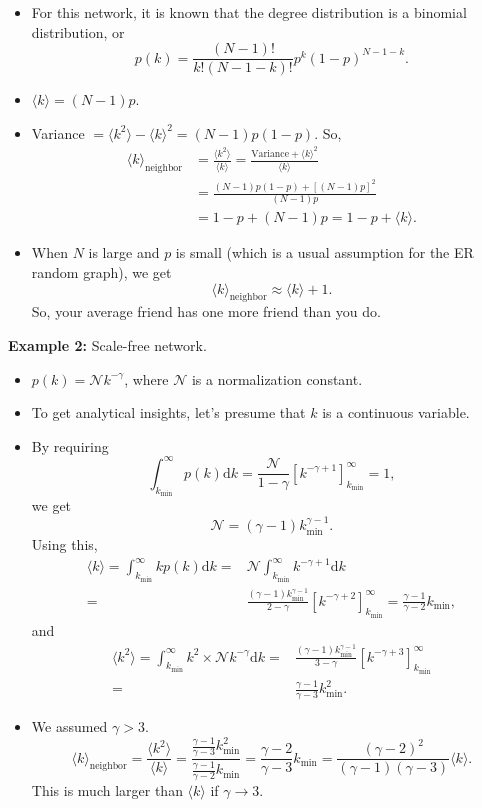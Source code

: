 \documentclass[20pt]{extarticle}
\begin{document}
\begin{itemize}
\item For this network, it is known that the degree distribution is a binomial distribution, or
\[ p(k) = \frac{(N-1)!}{k!(N-1-k)!} p^k (1-p)^{N-1-k}. \]
\item $\langle k \rangle = (N-1)p$.
\item Variance $= \langle k^2 \rangle - \langle k \rangle^2 = (N-1)p(1-p)$. So,
\[
\begin{aligned}
\langle k\rangle_{\text{neighbor}} &= \frac{\langle k^2\rangle}{\langle k\rangle} =
\frac{\text{Variance} + \langle k\rangle^2}{\langle k\rangle}\\
&= \frac{(N-1)p(1-p) + \left[(N-1)p\right]^2}{(N-1)p}\\
&= 1-p + (N-1)p = 1-p + \langle k\rangle.
\end{aligned}
\]
\item When $N$ is large and $p$ is small (which is a usual assumption for the ER random graph), we get
\[ \langle k\rangle_{\text{neighbor}} \approx \langle k\rangle + 1. \]
So, your average friend has one more friend than you do.
\end{itemize}

\noindent\textbf{Example 2:} Scale-free network.
\begin{itemize}
\item $p(k) = \mathcal{N} k^{-\gamma}$, where $\mathcal{N}$ is a normalization constant.
\item To get analytical insights, let's presume that $k$ is a continuous variable.
\item By requiring
\[ \int^{\infty}_{k_{\min}}p(k)\text{d}k = \frac{\mathcal{N}}{1-\gamma}\left[k^{-\gamma+1}\right]^{\infty}_{k_{\min}} = 1, \]
we get
\[ \mathcal{N}=(\gamma-1)k_{\min}^{\gamma-1}. \]
Using this,
\[
\begin{aligned}
\langle k\rangle = \int^{\infty}_{k_{\min}} kp(k)\text{d}k
=& \mathcal{N} \int^{\infty}_{k_{\min}}k^{-\gamma+1}\text{d}k\\
=& \frac{(\gamma-1)k_{\min}^{\gamma-1}}{2-\gamma}
\left[k^{-\gamma+2}\right]^{\infty}_{k_{\min}} = \frac{\gamma-1}{\gamma-2}k_{\min},
\end{aligned}
\]
and
\[
\begin{aligned}
\langle k^2\rangle = \int^{\infty}_{k_{\min}}k^2\times \mathcal{N} k^{-\gamma}\text{d}k
=& \frac{(\gamma-1)k_{\min}^{\gamma-1}}
{3-\gamma} \left[k^{-\gamma+3} \right]^{\infty}_{k_{\min}}\\
=& \frac{\gamma-1}{\gamma-3} k_{\min}^2.
\end{aligned}
\]
\item We assumed $\gamma > 3$.
\[ \langle k\rangle_{\text{neighbor}} = \frac{\langle k^2\rangle}{\langle k\rangle} =
\frac{\frac{\gamma-1}{\gamma-3}k_{\min}^2} {\frac{\gamma-1}{\gamma-2}k_{\min}} = \frac{\gamma-2}{\gamma-3} k_{\min}
= \frac{(\gamma-2)^2}{(\gamma-1)(\gamma-3)}\langle k\rangle. \]
This is much larger than $\langle k\rangle$ if $\gamma \to 3$.
\end{itemize}
\end{document}
